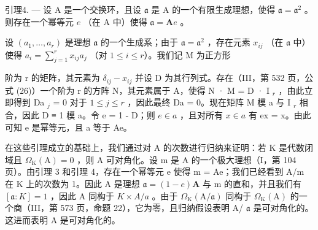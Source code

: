 引理4. --- 设 A 是一个交换环，且设 \(\mathfrak{a}\) 是 A 的一个有限生成理想，使得 \(\mathfrak{a} = \mathfrak{a}^2\) 。则存在一个幂等元 \(e\) （在 A 中）使得 \(\mathfrak{a} = \mathbf{A}e\) 。

设 \((a_{1},\ldots ,a_{r})\) 是理想 \(\mathfrak{a}\) 的一个生成系；由于 \(\mathfrak{a} = \mathfrak{a}^2\) ，存在元素 \(x_{ij}\) （在 \(\mathfrak{a}\) 中）使得 \(a_{i} = \sum_{j = 1}^{r}x_{ij}a_{j}\) （对 \(1\leqslant i\leqslant r\)）。我们记 M 为正方形

阶为 r 的矩阵，其元素为 \(\delta_{ij} - x_{ij}\) 并设 D 为其行列式。存在（III，第 532 页，公式 (26)）一个阶为 r 的方阵 N，其元素属于 A，使得 N · M = D · I \(_{r}\) ，由此立即得到 Da \(_{j}\) = 0 对于 \(1 \leqslant j \leqslant r\) ，因此最终 Da = 0。现在矩阵 M 模 a 与 I \(_{r}\) 相合，因此 D ≡ 1 模 a。令 e = 1 - D；则 \(e \in a\) ，且对所有 \(x \in a\) 有 ex = x。由此可知 e 是幂等元，且 a 等于 Ae。

在这些引理成立的基础上，我们通过对 A 的次数进行归纳来证明：若 K 是代数闭域且 \(\Omega_{\mathrm{K}}(\mathrm{A})=0\) ，则 A 可对角化。设 m 是 A 的一个极大理想（I，第 104 页）。由引理 3 和引理 4，存在一个幂等元 e 使得 m = Ae；我们已经看到 A/m 在 K 上的次数为 1。因此 A 是理想 \(\mathfrak{a}=(1-e)\mathbf{A}\) 与 m 的直和，并且我们有 \([\mathfrak{a}:K]=1\) ，因此 A 同构于 \(K\times A/a\) 。由于 \(\Omega_{\mathrm{K}}(\mathrm{A}/\mathfrak{a})\) 同构于 \(\Omega_{\mathrm{K}}(\mathrm{A})\) 的一个商（III，第 573 页，命题 22），它为零，且归纳假设表明 A/ \(\mathfrak{a}\) 是可对角化的。这进而表明 A 是可对角化的。

